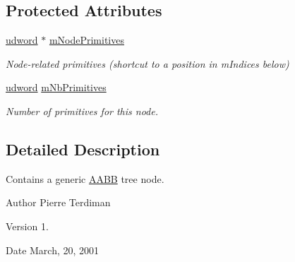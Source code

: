 \subsection*{Protected Attributes}
\begin{DoxyCompactItemize}
\item 
\hypertarget{class_a_a_b_b_tree_node_ac01ca7b2cdae3d84ace89e53b700f319}{\hyperlink{_ice_types_8h_a44c6f1920ba5551225fb534f9d1a1733}{udword} $\ast$ \hyperlink{class_a_a_b_b_tree_node_ac01ca7b2cdae3d84ace89e53b700f319}{m\+Node\+Primitives}}\label{class_a_a_b_b_tree_node_ac01ca7b2cdae3d84ace89e53b700f319}

\begin{DoxyCompactList}\small\item\em Node-\/related primitives (shortcut to a position in m\+Indices below) \end{DoxyCompactList}\item 
\hypertarget{class_a_a_b_b_tree_node_ad06152e9431cd71da9d82ac60801b9a0}{\hyperlink{_ice_types_8h_a44c6f1920ba5551225fb534f9d1a1733}{udword} \hyperlink{class_a_a_b_b_tree_node_ad06152e9431cd71da9d82ac60801b9a0}{m\+Nb\+Primitives}}\label{class_a_a_b_b_tree_node_ad06152e9431cd71da9d82ac60801b9a0}

\begin{DoxyCompactList}\small\item\em Number of primitives for this node. \end{DoxyCompactList}\end{DoxyCompactItemize}


\subsection{Detailed Description}
Contains a generic \hyperlink{class_a_a_b_b}{A\+A\+B\+B} tree node.

\begin{DoxyAuthor}{Author}
Pierre Terdiman 
\end{DoxyAuthor}
\begin{DoxyVersion}{Version}
1. 
\end{DoxyVersion}
\begin{DoxyDate}{Date}
March, 20, 2001 
\end{DoxyDate}


